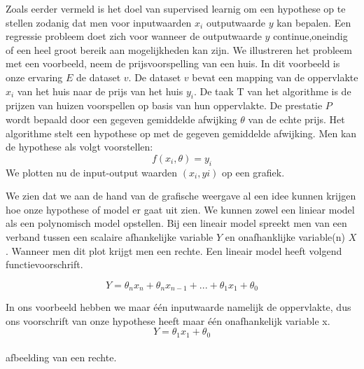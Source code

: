 Zoals eerder vermeld is het doel van supervised learnig om een hypothese op te stellen zodanig dat men voor inputwaarden $x_{i}$ outputwaarde $y$ kan bepalen. Een regressie probleem doet zich voor wanneer de outputwaarde $y$ continue,oneindig of een heel groot bereik aan mogelijkheden kan zijn. We illustreren het probleem met een voorbeeld, neem de prijsvoorspelling van een huis. 
In dit voorbeeld is onze ervaring $E$ de dataset $v$. De dataset $v$ bevat een mapping van de oppervlakte $x_{i}$ van het huis naar de prijs van het huis $y_{i}$. De taak T van het algorithme is de prijzen van huizen voorspellen op basis van hun oppervlakte. De prestatie $P$ wordt bepaald door een gegeven gemiddelde afwijking $\theta$ van de echte prijs. Het algorithme stelt een hypothese op met de gegeven gemiddelde afwijking. Men kan de hypothese als volgt voorstellen:
\[ f(x_{i},\theta) = y_{i} \] 
\newline
We plotten nu de input-output waarden $(x_{i},y{i})$ op een grafiek.
\newline
\newline

 We zien dat we aan de hand van de grafische weergave al een idee kunnen krijgen hoe onze hypothese of model er gaat uit zien. We kunnen zowel een liniear model als een polynomisch model opstellen. Bij een lineair model spreekt men van een verband tussen een scalaire afhankelijke variable $Y$ en onafhanklijke variable(n) $X$. Wanneer men dit plot krijgt men een rechte. Een lineair model heeft volgend functievoorschrift.

\[Y =  \theta_{n}x_{n} + \theta_{n}x_{n-1} + ... + \theta_{1}x_{1} + \theta_{0}\]
\newline

In ons voorbeeld hebben we maar \'e\'en inputwaarde namelijk de oppervlakte, dus ons voorschrift van onze hypothese heeft maar \'e\'en onafhankelijk variable x.
\newline
\[ Y = \theta_{1}x_{1} + \theta_{0}\] \\ 
afbeelding van een rechte.


